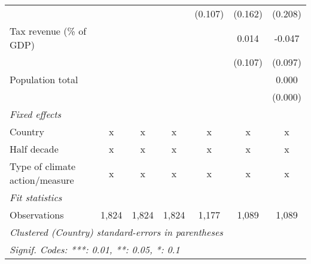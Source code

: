 \begin{tabular}{lcccccc}
                                                           &         &         &               & (0.107)       & (0.162)       & (0.208)\\   
   Tax revenue (\% of GDP)                                 &         &         &               &               & 0.014         & -0.047\\   
                                                           &         &         &               &               & (0.107)       & (0.097)\\   
   Population total                                        &         &         &               &               &               & 0.000\\   
                                                           &         &         &               &               &               & (0.000)\\   
   \emph{Fixed effects}\\
   Country                                                 & x       & x       & x             & x             & x             & x\\  
   Half decade                                             & x       & x       & x             & x             & x             & x\\  
   Type of climate action/measure                          & x       & x       & x             & x             & x             & x\\  
   \midrule \emph{Fit statistics}\\
   Observations                                            & 1,824   & 1,824   & 1,824         & 1,177         & 1,089         & 1,089\\  
   \midrule
   \multicolumn{7}{l}{\emph{Clustered (Country) standard-errors in parentheses}}\\
   \multicolumn{7}{l}{\emph{Signif. Codes: ***: 0.01, **: 0.05, *: 0.1}}\\
\end{tabular}
\par\endgroup


